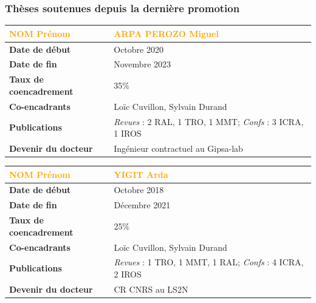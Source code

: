 \documentclass[a4paper,12pt]{article}
\newcommand{\separation}{\noindent{\color{black!40}\rule{\textwidth}{1pt}}}
\begin{document}
\newrefsection
\nocite{2-ANCDxx,2-NDCD24,2-NDCD24-ICRA}
\printbibliography[title={\small Publications du doctorant}]

\newpage
\subsubsection{Thèses soutenues depuis la dernière promotion}

%
%
\begin{table}[htbp]
\label{tab:Miguel}
\centering
\begin{tabular}{>{\bfseries}ll}
\toprule %
\textup{\textcolor{orange}{NOM Prénom}} & \large{\textcolor{orange}{ARPA PEROZO Miguel}}\\
\midrule
Date de début               & Octobre 2020\\
Date de fin                 & Novembre 2023\\
Taux de coencadrement       & 35\%\\
Co-encadrants               & Loïc Cuvillon, Sylvain Durand\\
Publications                & \emph{Revues} : 2 RAL, 1 TRO, 1 MMT; \emph{Confs} : 3 ICRA, 1 IROS\\
Devenir du docteur          & Ingénieur contractuel au Gipsa-lab\\
\bottomrule
\end{tabular}
\end{table}

\newrefsection
\nocite{2-ANCDxx,2-CAYD23,2-YCAD23,4-ADYC22,2-YACD21,4-YAOC21,4-YACD21,4-YACD21a}
\printbibliography[title={\small Publications du doctorant}]

\separation{}

\newpage
%
%
\begin{table}[htbp]
\label{tab:Arda}
\centering
\begin{tabular}{>{\bfseries}ll}
\toprule %
\textup{\textcolor{orange}{NOM Prénom}} & \large{\textcolor{orange}{YIGIT Arda}}\\
\midrule
Date de début               & Octobre 2018\\
Date de fin                 & Décembre 2021\\
Taux de coencadrement       & 25\%\\
Co-encadrants               & Loïc Cuvillon, Sylvain Durand\\
Publications                & \emph{Revues} : 1 TRO, 1 MMT, 1 RAL; \emph{Confs} : 4 ICRA, 2 IROS \\
Devenir du docteur          & CR CNRS au LS2N\\
\bottomrule
\end{tabular}
\end{table}
\end{document}
